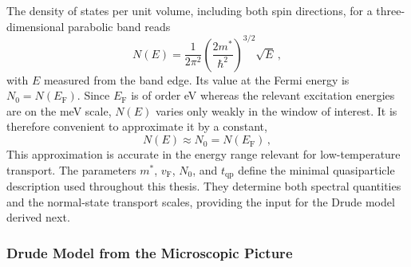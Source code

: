             The density of states per unit volume, including both spin directions, for a three-dimensional parabolic band reads
            \begin{equation}
                N(E) = \frac{1}{2\pi^2} \left( \frac{2m^\ast}{\hbar^2} \right)^{3/2} \sqrt{E}\,,
                \label{eq:basics:n-dos}
            \end{equation}
            with $E$ measured from the band edge. Its value at the Fermi energy is $N_0 = N(E_\mathrm{F})$. Since $E_\mathrm{F}$ is of order eV whereas the relevant excitation energies are on the meV scale, $N(E)$ varies only weakly in the window of interest. It is therefore convenient to approximate it by a constant,
            \begin{equation}
                N(E) \approx N_0 = N(E_\mathrm{F})\,,
                \label{eq:basics:n-dos-approx}
            \end{equation}
            This approximation is accurate in the energy range relevant for low-temperature transport. The parameters $m^\ast$, $v_\mathrm{F}$, $N_0$, and $t_\mathrm{qp}$ define the minimal quasiparticle description used throughout this thesis. They determine both spectral quantities and the normal-state transport scales, providing the input for the Drude model derived next. \cite{ashcroft_solid_2012, gross_festkorperphysik_2014}

        \subsubsection*{Drude Model from the Microscopic Picture}

